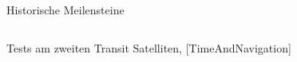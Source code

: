 \begin{frame}{Historische Meilensteine}
\begin{columns}
\begin{column}{0.35\textwidth}
\begin{figure}
            \end{figure}
            Tests am zweiten Transit Satelliten, {\small [TimeAndNavigation]}
        \end{column}
    \end{columns}
\end{frame}
